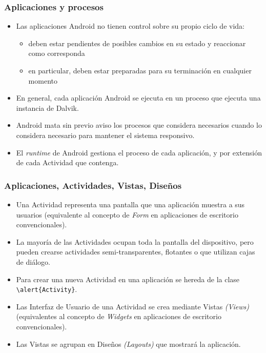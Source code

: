 \documentclass[hyperref={pdfpagelabels=true},ucs]{beamer}
\begin{document}
\begin{frame}
\frametitle{Aplicaciones y procesos}

\begin{itemize}
\item Las aplicaciones Android no tienen control sobre su propio
  ciclo de vida:
  \begin{itemize}
  \item deben estar pendientes de posibles cambios en su estado y
    reaccionar como corresponda
  \item en particular, deben estar preparadas para su terminación en
    cualquier momento
  \end{itemize}
\item En general, cada aplicación Android se ejecuta en un proceso que
  ejecuta una instancia de Dalvik.
\item \alert{Android mata sin previo aviso los procesos que considera
  necesarios cuando lo considera necesario para mantener el sistema
  responsivo}.
\item El \emph{runtime} de Android gestiona el proceso de cada
  aplicación, y por extensión de cada Actividad que contenga.

\end{itemize}

\end{frame}



\begin{frame}
\frametitle{Aplicaciones, Actividades, Vistas, Diseños}

\begin{itemize}

\item Una Actividad representa una pantalla que una aplicación muestra
  a sus usuarios (equivalente al concepto de \emph{Form} en
  aplicaciones de escritorio convencionales).

\item La mayoría de las Actividades ocupan toda la pantalla del
  dispositivo, pero pueden crearse actividades semi-transparentes,
  flotantes o que utilizan cajas de diálogo.

\item Para crear una nueva Actividad en una aplicación se hereda de la
  clase \Verb|\alert{Activity}|.

\item Las Interfaz de Usuario de una Actividad se crea mediante
  \alert{Vistas} \emph{(Views)} (equivalentes al concepto de
  \emph{Widgets} en aplicaciones de escritorio convencionales).

\item Las Vistas se agrupan en Diseños \emph{(Layouts)} que mostrará la
  aplicación.

\end{itemize}

\end{frame}
\end{document}
